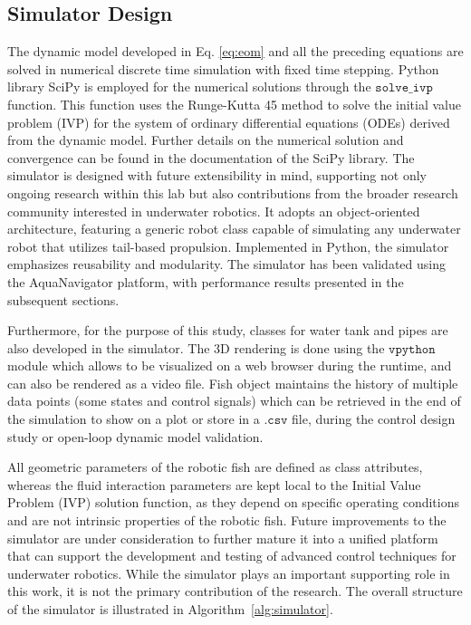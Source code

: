 \documentclass[pdflatex,sn-mathphys-num]{sn-jnl}
\theoremstyle{thmstyleone}%
\begin{document}
\subsection{Simulator Design}
\par The dynamic model developed in Eq. \ref{eq:eom} and all the preceding equations are solved in numerical discrete time simulation with fixed time stepping. Python library SciPy \cite{2020SciPyNMeth} is employed for the numerical solutions through the $\mathtt{solve\_ivp}$ function. This function uses the Runge-Kutta 45 method to solve the initial value problem (IVP) for the system of ordinary differential equations (ODEs) derived from the dynamic model. Further details on the numerical solution and convergence can be found in the documentation of the SciPy library. The simulator is designed with future extensibility in mind, supporting not only ongoing research within this lab but also contributions from the broader research community interested in underwater robotics. It adopts an object-oriented architecture, featuring a generic robot class capable of simulating any underwater robot that utilizes tail-based propulsion. Implemented in Python, the simulator emphasizes reusability and modularity. The simulator has been validated using the AquaNavigator platform, with performance results presented in the subsequent sections.\par
Furthermore, for the purpose of this study, classes for water tank and pipes are also developed in the simulator. The 3D rendering is done using the $\mathtt{vpython}$ module which allows to be visualized on a web browser during the runtime, and can also be rendered as a video file. Fish object maintains the history of multiple data points (some states and control signals) which can be retrieved in the end of the simulation to show on a plot or store in a $\mathtt{.csv}$ file, during the control design study or open-loop dynamic model validation. 
\par All geometric parameters of the robotic fish are defined as class attributes, whereas the fluid interaction parameters are kept local to the Initial Value Problem (IVP) solution function, as they depend on specific operating conditions and are not intrinsic properties of the robotic fish. Future improvements to the simulator are under consideration to further mature it into a unified platform that can support the development and testing of advanced control techniques for underwater robotics. While the simulator plays an important supporting role in this work, it is not the primary contribution of the research. The overall structure of the simulator is illustrated in Algorithm~\ref{alg:simulator}.
\end{document}

